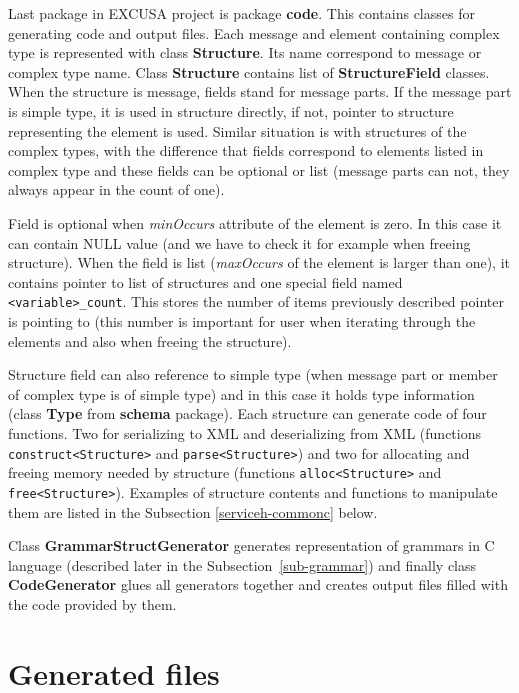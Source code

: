 \documentclass[12pt,notitlepage]{report}
\begin{document}
Last package in EXCUSA project is package \textbf{code}. This contains classes for generating code and output files. Each message and element containing complex type is represented with class \textbf{Structure}. Its name correspond to message or complex type name. Class \textbf{Structure} contains list of \textbf{StructureField} classes. When the structure is message, fields stand for message parts. If the message part is simple type, it is used in structure directly, if not, pointer to structure representing the element is used. Similar situation is with structures of the complex types, with the difference that fields correspond to elements listed in complex type and these fields can be optional or list (message parts can not, they always appear in the count of one).

Field is optional when \textit{minOccurs} attribute of the element is zero. In this case it can contain NULL value (and we have to check it for example when freeing structure). When the field is list (\textit{maxOccurs} of the element is larger than one), it contains pointer to list of structures and one special field named \texttt{<variable>\_count}. This stores the number of items previously described pointer is pointing to (this number is important for user when iterating through the elements and also when freeing the structure).

Structure field can also reference to simple type (when message part or member of complex type is of simple type) and in this case it holds type information (class \textbf{Type} from \textbf{schema} package). Each structure can generate code of four functions. Two for serializing to XML and deserializing from XML (functions \texttt{construct<Structure>} and \texttt{parse<Structure>}) and two for allocating and freeing memory needed by structure (functions \texttt{alloc<Structure>} and \texttt{free<Structure>}). Examples of structure contents and functions to manipulate them are listed in the Subsection \ref{serviceh-commonc} below.

Class \textbf{GrammarStructGenerator} generates representation of grammars in C language (described later in the Subsection~\ref{sub-grammar}) and finally class \textbf{CodeGenerator} glues all generators together and creates output files filled with the code provided by them.

\section{Generated files}
\end{document}
